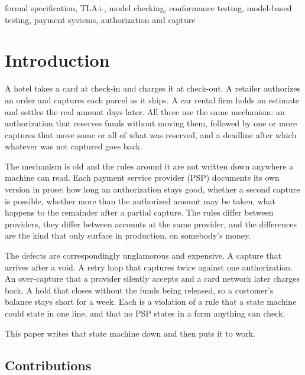 \documentclass[conference]{IEEEtran}
\begin{document}
\begin{IEEEkeywords}
formal specification, TLA+, model checking, conformance testing, model-based
testing, payment systems, authorization and capture
\end{IEEEkeywords}

\section{Introduction}

A hotel takes a card at check-in and charges it at check-out. A retailer
authorizes an order and captures each parcel as it ships. A car rental firm holds
an estimate and settles the real amount days later. All three use the same
mechanism: an authorization that reserves funds without moving them, followed by
one or more captures that move some or all of what was reserved, and a deadline
after which whatever was not captured goes back.

The mechanism is old and the rules around it are not written down anywhere a
machine can read. Each payment service provider (PSP) documents its own version
in prose: how long an authorization stays good, whether a second capture is
possible, whether more than the authorized amount may be taken, what happens to
the remainder after a partial capture. The rules differ between providers, they
differ between accounts at the same provider, and the differences are the kind
that only surface in production, on somebody's money.

The defects are correspondingly unglamorous and expensive. A capture that
arrives after a void. A retry loop that captures twice against one
authorization. An over-capture that a provider silently accepts and a card
network later charges back. A hold that closes without the funds being released,
so a customer's balance stays short for a week. Each is a violation of a rule
that a state machine could state in one line, and that no PSP states in a form
anything can check.

This paper writes that state machine down and then puts it to work.

\subsection{Contributions}
\end{document}
